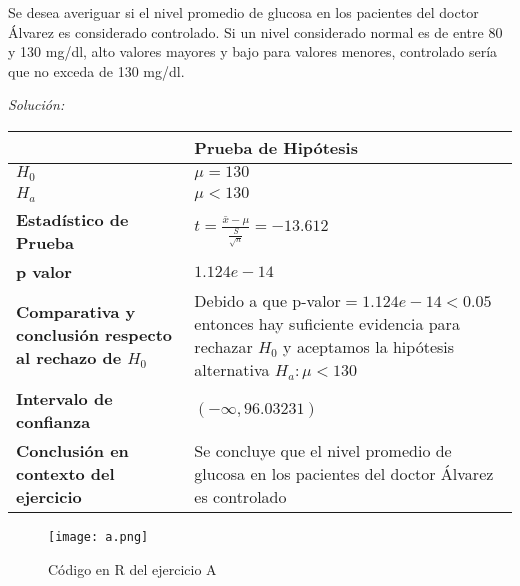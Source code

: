 \documentclass[12pt]{article}
\newenvironment{problem}[2][Problema]{\begin{trivlist}
\item[\hskip \labelsep {\bfseries #1}\hskip \labelsep {\bfseries #2.}]}{\end{trivlist}}
\newenvironment{sol}
    {\emph{Solución:}
    }
    {
    }
\begin{document}
\pagebreak

\begin{problem}{A} 
Se desea averiguar si el nivel promedio de glucosa en los pacientes del doctor Álvarez es considerado controlado. Si un nivel considerado normal es de entre 80 y 130 mg/dl, alto valores mayores y bajo para valores menores, controlado sería que no exceda de 130 mg/dl.
\end{problem}

\begin{sol}
\begin{table}[h!]
\centering
\begin{tabular}{|>{\raggedright\arraybackslash}m{6cm}|>{\raggedright\arraybackslash}m{6cm}|}
\hline
 & \textbf{Prueba de Hipótesis} \\ \hline
$H_0$ & $\mu=130$ \\ \hline
$H_a$ & $\mu<130$ \\ \hline
\textbf{Estadístico de Prueba} & \vspace{0.5cm}$t=\frac{\bar{x}-\mu}{\frac{S}{\sqrt{n}}}=-13.612$\vspace{0.5cm} \\ \hline
\textbf{p valor} & $1.124e-14$ \\ \hline
\textbf{Comparativa y conclusión respecto al rechazo de $H_0$} & Debido a que p-valor$=1.124e-14<0.05$ entonces hay suficiente evidencia para rechazar $H_0$ y aceptamos la hipótesis alternativa $H_a: \mu<130$ \\ \hline
\textbf{Intervalo de confianza} & $(-\infty , 96.03231)$ \\ \hline
\textbf{Conclusión en contexto del ejercicio} & Se concluye que el nivel promedio de glucosa en los pacientes del doctor Álvarez es controlado \\ \hline
\end{tabular}
\label{tab:hipotesis}
\end{table}

\begin{figure}[h]  %
    \centering      %
    \texttt{[image: a.png]} 
    \caption{Código en R del ejercicio A}
\end{figure}

\end{sol}

\end{document}
